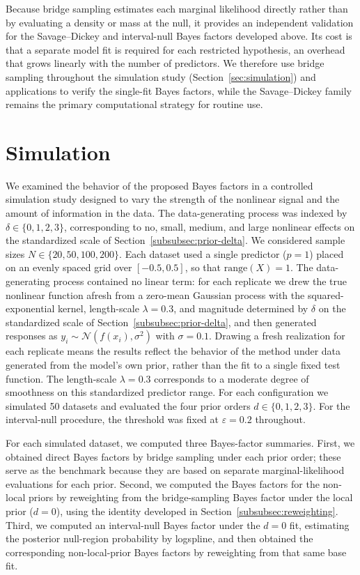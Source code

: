 \documentclass{article}
\begin{document}
Because bridge sampling estimates each marginal likelihood
directly rather than by evaluating a density or mass at the null,
it provides an independent validation for the Savage--Dickey and
interval-null Bayes factors developed above.
Its cost is that a separate model fit is required for each
restricted hypothesis, an overhead that grows linearly with the
number of predictors.
We therefore use bridge sampling throughout the simulation study
(Section~\ref{sec:simulation}) and applications to verify the
single-fit Bayes factors, while the Savage--Dickey family remains
the primary computational strategy for routine use.

\section{Simulation\label{sec:simulation}}

We examined the behavior of the proposed Bayes factors in a controlled
simulation study designed to vary the strength of the nonlinear signal
and the amount of information in the data. The data-generating process
was indexed by $\delta \in \{0,1,2,3\}$, corresponding to no, small,
medium, and large nonlinear effects on the standardized scale of
Section~\ref{subsubsec:prior-delta}. We considered sample sizes
$N \in \{20,50,100,200\}$. Each dataset used a single predictor
($p=1$) placed on an evenly spaced grid over $[-0.5,0.5]$, so that
$\mathrm{range}(X)=1$. The data-generating process contained no linear
term: for each replicate we drew the true nonlinear function afresh from
a zero-mean Gaussian process with the squared-exponential kernel,
length-scale $\lambda=0.3$, and magnitude determined by $\delta$ on the
standardized scale of Section~\ref{subsubsec:prior-delta}, and then
generated responses as $y_i \sim \mathcal{N}(f(x_i),\sigma^2)$ with
$\sigma=0.1$. Drawing a fresh realization for each replicate means the
results reflect the behavior of the method under data generated from the
model's own prior, rather than the fit to a single fixed test function.
The length-scale $\lambda=0.3$ corresponds to a moderate degree of
smoothness on this standardized predictor range. For each configuration
we simulated 50 datasets and evaluated the four prior orders
$d \in \{0,1,2,3\}$. For
the interval-null procedure, the threshold was fixed at
$\varepsilon=0.2$ throughout.

For each simulated dataset, we computed three Bayes-factor summaries.
First, we obtained direct Bayes factors by bridge sampling under each
prior order; these serve as the benchmark because they are based on
separate marginal-likelihood evaluations for each prior. Second, we
computed the Bayes factors for the non-local priors by reweighting from
the bridge-sampling Bayes factor under the local prior ($d=0$), using
the identity developed in Section~\ref{subsubsec:reweighting}. Third, we
computed an interval-null Bayes factor under the $d=0$ fit, estimating
the posterior null-region probability by logspline, and then obtained
the corresponding non-local-prior Bayes factors by reweighting from that
same base fit.
\end{document}

